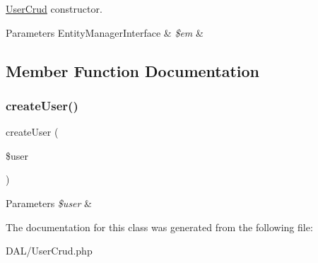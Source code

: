 \mbox{\hyperlink{class_app_1_1_d_a_l_1_1_user_crud}{User\+Crud}} constructor. 
\begin{DoxyParams}[1]{Parameters}
Entity\+Manager\+Interface & {\em \$em} & \\
\hline
\end{DoxyParams}


\subsection{Member Function Documentation}
\mbox{\label{class_app_1_1_d_a_l_1_1_user_crud_a77fe896cc650f09c39927b9533ca8a0c}} 
\subsubsection{\texorpdfstring{createUser()}{createUser()}}
{\footnotesize\ttfamily create\+User (\begin{DoxyParamCaption}\item[{}]{\$user }\end{DoxyParamCaption})}


\begin{DoxyParams}{Parameters}
{\em \$user} & \\
\hline
\end{DoxyParams}


The documentation for this class was generated from the following file\+:\begin{DoxyCompactItemize}
\item 
D\+A\+L/User\+Crud.\+php\end{DoxyCompactItemize}
